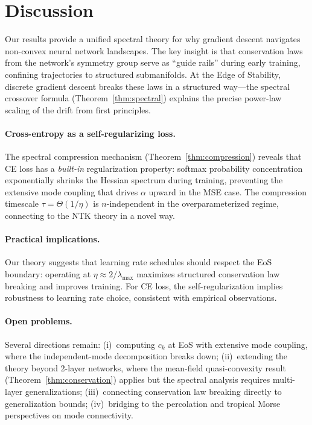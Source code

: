 \documentclass[11pt]{article}
\newcommand{\lr}{\eta}                    %
\newcommand{\drexp}{\alpha}               %
\newcommand{\nsamples}{n}                 %
\newcommand{\spectau}{\tau}               %
\theoremstyle{definition}
\theoremstyle{remark}
\begin{document}
\section{Discussion}
\label{sec:discussion}

Our results provide a unified spectral theory for why gradient descent navigates non-convex neural network landscapes. The key insight is that conservation laws from the network's symmetry group serve as ``guide rails'' during early training, confining trajectories to structured submanifolds. At the Edge of Stability, discrete gradient descent breaks these laws in a structured way---the spectral crossover formula (Theorem~\ref{thm:spectral}) explains the precise power-law scaling of the drift from first principles.

\paragraph{Cross-entropy as a self-regularizing loss.}
The spectral compression mechanism (Theorem~\ref{thm:compression}) reveals that CE loss has a \emph{built-in} regularization property: softmax probability concentration exponentially shrinks the Hessian spectrum during training, preventing the extensive mode coupling that drives $\drexp$ upward in the MSE case. The compression timescale $\spectau = \Theta(1/\lr)$ is $\nsamples$-independent in the overparameterized regime, connecting to the NTK theory in a novel way.

\paragraph{Practical implications.}
Our theory suggests that learning rate schedules should respect the EoS boundary: operating at $\lr \approx 2/\lambda_{\max}$ maximizes structured conservation law breaking and improves training. For CE loss, the self-regularization implies robustness to learning rate choice, consistent with empirical observations.

\paragraph{Open problems.}
Several directions remain:
(i)~computing $c_k$ at EoS with extensive mode coupling, where the independent-mode decomposition breaks down;
(ii)~extending the theory beyond 2-layer networks, where the mean-field quasi-convexity result (Theorem~\ref{thm:conservation}) applies but the spectral analysis requires multi-layer generalizations;
(iii)~connecting conservation law breaking directly to generalization bounds;
(iv)~bridging to the percolation and tropical Morse perspectives on mode connectivity.
\end{document}
